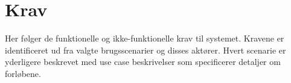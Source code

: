 \chapter{Krav}
Her følger de funktionelle og ikke-funktionelle krav til systemet. Kravene er identificeret ud fra valgte brugsscenarier og disses aktører. Hvert scenarie er yderligere beskrevet med use case beskrivelser som specificerer detaljer om forløbene.






